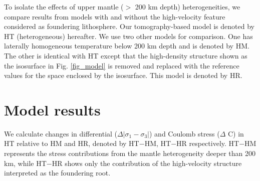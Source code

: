 \documentclass[draft,linenumbers]{agujournal2018}
\begin{document}
To isolate the effects of upper mantle ($>$ 200 km depth) heterogeneities, we compare results from models with and without the high-velocity feature considered as foundering lithosphere. Our tomography-based model is denoted by HT (heterogeneous) hereafter. We use two other models for comparison. One has laterally homogeneous temperature below 200 km depth and is denoted by HM. The other is identical with HT except that the high-density structure shown as the isosurface in Fig. \ref{fig_model} is removed and replaced with the reference values for the space enclosed by the isosurface. This model is denoted by HR.

\section{Model results}
We calculate changes in differential ($\Delta|\sigma_1 - \sigma_3|$) and Coulomb stress ($\Delta$ C) in HT relative to HM and HR, denoted by HT$-$HM, HT$-$HR respectively. HT$-$HM represents the stress contributions from the mantle heterogeneity deeper than 200 km, while HT$-$HR shows only the contribution of the high-velocity structure interpreted as the foundering root. 
\end{document}
